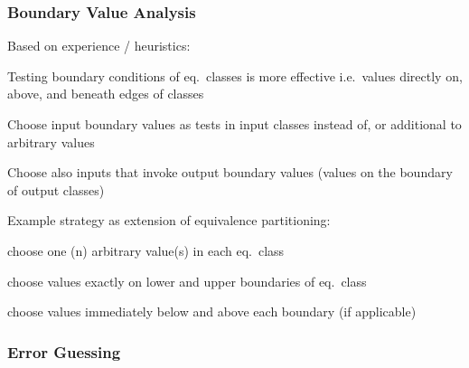 
\subsubsection{Boundary Value Analysis}

Based on experience / heuristics:
\begin{itemize*}
\item Testing boundary conditions of eq.\ classes is more effective i.e.\ values directly on, above, and beneath edges of classes
\item Choose input boundary values as tests in input classes instead of, or additional to arbitrary values
\item Choose also inputs that invoke output boundary values (values on the boundary of output classes)
\item Example strategy as extension of equivalence partitioning:
\begin{itemize*}
	\item choose one (n) arbitrary value(s) in each eq.\ class %
	\item choose values exactly on lower and upper boundaries of eq.\ class
	\item choose values immediately below and above each boundary (if applicable)
\end{itemize*}
\end{itemize*}


\subsubsection{Error Guessing}


